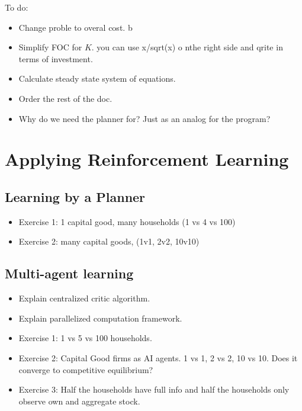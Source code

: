 \documentclass[11pt,english]{article}
\begin{document}
\begin{itemize}
	{\color{red} To do: 
		\begin{itemize}
			\item Change proble to overal cost.  b
			\item Simplify FOC for $K$. you can use x/sqrt(x) o nthe right side and qrite in terms of investment.
			\item Calculate steady state system of equations. 
			\item Order the rest of the doc.
			\item Why do we need the planner for? Just as an analog for the program?
	\end{itemize}}
	
\end{itemize}

\section{Applying Reinforcement Learning}


\subsection{Learning by a Planner}

\begin{itemize}
	\item Exercise 1: 1 capital good, many households (1 vs 4 vs 100)
	\item Exercise 2: many capital goods, (1v1, 2v2, 10v10)
\end{itemize}

\subsection{Multi-agent learning}
\begin{itemize}
	\item Explain centralized critic algorithm.
	\item Explain parallelized computation framework.
	\item Exercise 1: 1 vs 5 vs 100 households.
	\item Exercise 2: Capital Good firms as AI agents. 1 vs 1, 2 vs 2, 10 vs 10. Does it converge to competitive equilibrium?	
	\item Exercise 3: Half the households have full info and half the households only observe own and aggregate stock.
\end{itemize}
\end{document}
